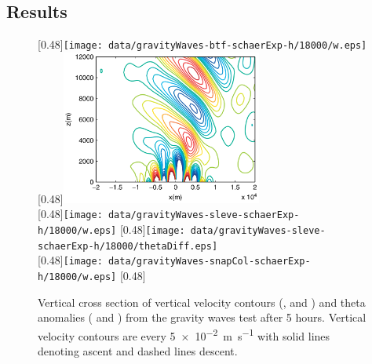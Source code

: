 \subsection{Results}

\begin{figure}
	\captionsetup[subfigure]{position=b}
	\centering
	[0.48\textwidth]{\texttt{[image: data/gravityWaves-btf-schaerExp-h/18000/w.eps]}}
	\hfill
	[0.48\textwidth]{\includegraphics[height=2in]{img/melvin-7a.png}} \\
	[0.48\textwidth]{\texttt{[image: data/gravityWaves-sleve-schaerExp-h/18000/w.eps]}}
	\hfill
	[0.48\textwidth]{\texttt{[image: data/gravityWaves-sleve-schaerExp-h/18000/thetaDiff.eps]}} \\
	[0.48\textwidth]{\texttt{[image: data/gravityWaves-snapCol-schaerExp-h/18000/w.eps]}}
	\hfill
	[0.48\textwidth]{}
%
	\caption{Vertical cross section of vertical velocity contours (,  and ) and theta anomalies ( and ) from the gravity waves test after 5 hours.  Vertical velocity contours are every \SI{5e-2}{\meter\per\second} with solid lines denoting ascent and dashed lines descent.}
	\label{fig:gw:w}
\end{figure}

